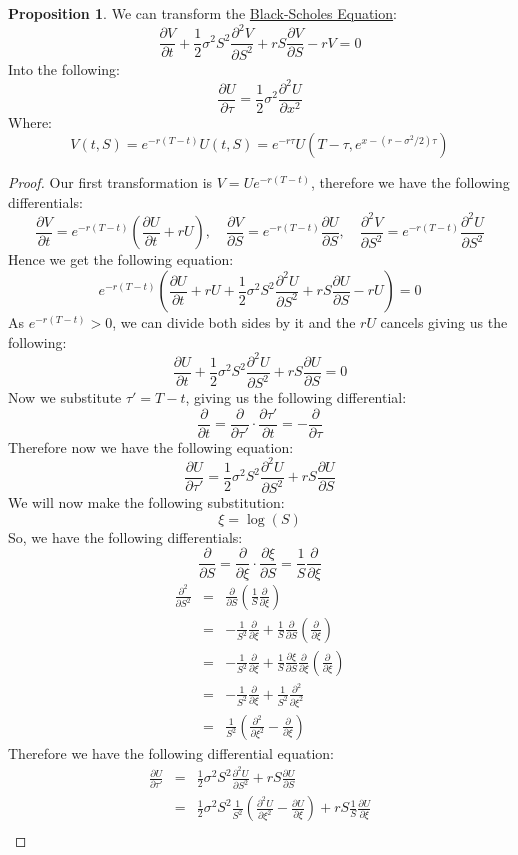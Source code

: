 \documentclass[11pt]{article}
\theoremstyle{definition}
\newtheorem{prop}{Proposition}[section]
\newcommand{\brac}[1]{\left(#1\right)}
\newcommand{\pardiff}[2]{\frac{\partial #1}{\partial #2}}
\begin{document}
	\begin{prop}
		We can transform the \hyperref[BSE]{Black-Scholes Equation}:
		$$ \pardiff{V}{t} + \frac{1}{2}\sigma^2S^2\pardiff{^2V}{S^2} + rS\pardiff{V}{S} -rV = 0$$
		Into the following:
		$$ \pardiff{U}{\tau} = \frac{1}{2}\sigma^2\pardiff{^2U}{x^2} $$
		Where:
		$$ V(t,S) = e^{-r\brac{T-t}}U(t,S)= e^{-r\tau}U\brac{T-\tau,e^{x-\brac{r-\sigma^2/2}\tau}}$$
	\end{prop}
	\begin{proof}
		Our first transformation is $V = Ue^{-r\brac{T-t}}$, therefore we have the following differentials:
		$$\pardiff{V}{t} = e^{-r\brac{T-t}}\brac{\pardiff{U}{t} + rU},\quad \pardiff{V}{S} = e^{-r\brac{T-t}}\pardiff{U}{S},\quad \pardiff{^2V}{S^2} = e^{-r\brac{T-t}}\pardiff{^2U}{S^2}$$
		Hence we get the following equation:
		$$  e^{-r\brac{T-t}}\brac{\pardiff{U}{t}+rU + \frac{1}{2}\sigma^2S^2\pardiff{^2U}{S^2} + rS\pardiff{U}{S} - rU} = 0$$
		As $e^{-r\brac{T-t}} > 0$, we can divide both sides by it and the $rU$ cancels giving us the following:
		$$ \pardiff{U}{t}+ \frac{1}{2}\sigma^2S^2\pardiff{^2U}{S^2} + rS\pardiff{U}{S} = 0$$
		Now we substitute $\tau' = T - t$, giving us the following differential:
		$$\pardiff{}{t} = \pardiff{}{\tau'}\cdot\pardiff{\tau'}{t} = -\pardiff{}{\tau}$$
		Therefore now we have the following equation:
		$$ \pardiff{U}{\tau'} = \frac{1}{2}\sigma^2S^2\pardiff{^2U}{S^2} + rS\pardiff{U}{S} $$
		We will now make the following substitution:
		$$\xi = \log\brac{S}$$
		So, we have the following differentials:
		$$\pardiff{}{S} = \pardiff{}{\xi}\cdot\pardiff{\xi}{S} = \frac{1}{S}\pardiff{}{\xi}$$
		\begin{eqnarray}
			\pardiff{^2}{S^2} &=& \pardiff{}{S}\brac{\frac{1}{S}\pardiff{}{\xi}} \\
			&=& -\frac{1}{S^2}\pardiff{}{\xi} + \frac{1}{S}\pardiff{}{S}\brac{\pardiff{}{\xi}}\\
			&=& -\frac{1}{S^2}\pardiff{}{\xi} +\frac{1}{S}\pardiff{\xi}{S}\pardiff{}{\xi}\brac{\pardiff{}{\xi}}\\
			&=& -\frac{1}{S^2}\pardiff{}{\xi} +\frac{1}{S^2}\pardiff{^2}{\xi^2}\\
			&=& \frac{1}{S^2}\brac{\pardiff{^2}{\xi^2}-\pardiff{}{\xi}}
		\end{eqnarray}
		Therefore we have the following differential equation:
		\begin{eqnarray*}
			\pardiff{U}{\tau'} &=& \frac{1}{2}\sigma^2S^2\pardiff{^2U}{S^2} + rS\pardiff{U}{S} \\
			&=& \frac{1}{2}\sigma^2S^2\frac{1}{S^2}\brac{\pardiff{^2U}{\xi^2}-\pardiff{U}{\xi}} + r S\frac{1}{S}\pardiff{U}{\xi}\\

\end{eqnarray*}
\end{proof}
\end{document}
